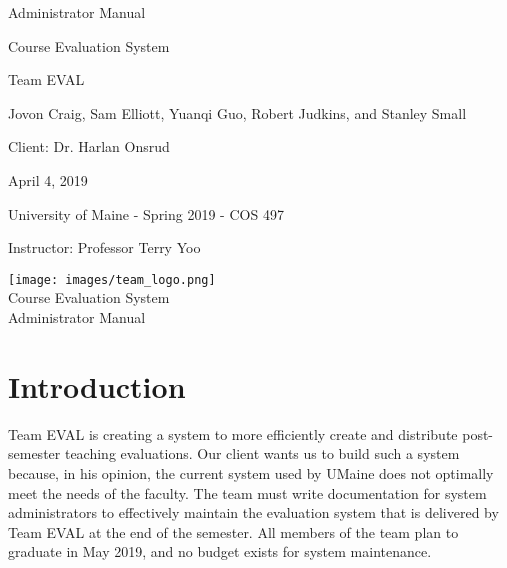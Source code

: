 \documentclass{article}
\begin{document}
\begin{titlepage}

\centering
\vspace*{2cm}
{\Huge Administrator Manual\par}
\vspace{.25cm}
{\LARGE Course Evaluation System\par}
\vspace{1cm}
{\Large Team EVAL\par}
\vspace{.2cm}
{\Large Jovon Craig, Sam Elliott, Yuanqi Guo, Robert Judkins, and Stanley Small\par}
\vspace{1cm}
{\Large Client: Dr. Harlan Onsrud\par}
\vspace{1cm}
{\Large April 4, 2019\par}
\vspace{11cm}

University of Maine - Spring 2019 - COS 497

Instructor: Professor Terry Yoo

\end{titlepage}

\newpage

\begin{center}
{\texttt{[image: images/team\_logo.png]}} \\ 	\bigskip
{\LARGE Course Evaluation System } \\ \medskip
{\large Administrator Manual } \\ \medskip
\end{center}

\tableofcontents

\newpage

\section{Introduction}

Team EVAL is creating a system to more efficiently create and distribute post-semester teaching evaluations. Our client wants us to build such a system because, in his opinion, the current system used by UMaine does not optimally meet the needs of the faculty. The team must write documentation for system administrators to effectively maintain the evaluation system that is delivered by Team EVAL at the end of the semester. All members of the team plan to graduate in May 2019, and no budget exists for system maintenance.
 
\end{document}
